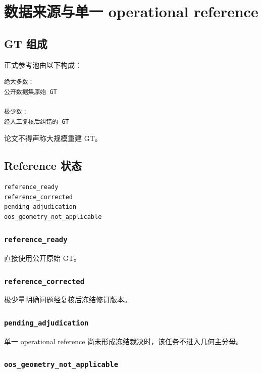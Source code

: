 \section{数据来源与单一 operational reference}

\subsection{GT 组成}

正式参考池由以下构成：

\begin{verbatim}
绝大多数：
公开数据集原始 GT

极少数：
经人工复核后纠错的 GT
\end{verbatim}

论文不得声称大规模重建 GT。

\subsection{Reference 状态}

\begin{verbatim}
reference_ready
reference_corrected
pending_adjudication
oos_geometry_not_applicable
\end{verbatim}

\subsubsection{\texttt{reference\_ready}}

直接使用公开原始 GT。

\subsubsection{\texttt{reference\_corrected}}

极少量明确问题经复核后冻结修订版本。

\subsubsection{\texttt{pending\_adjudication}}

单一 operational reference 尚未形成冻结裁决时，该任务不进入几何主分母。

\subsubsection{\texttt{oos\_geometry\_not\_applicable}}

